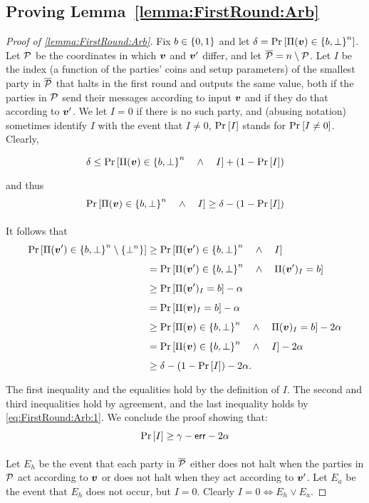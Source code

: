 \subsection{Proving Lemma~\ref{lemma:FirstRound:Arb}}
\begin{proof}[Proof of \cref{lemma:FirstRound:Arb}]
Fix $b \in \{0,1\}$ and let $\delta = \Pr_{}\left[\Pi({ \boldsymbol{v}}) \in \left\{b,\bot\right\}^n\right]$. Let $\mathcal{P}$ be the coordinates in which ${ \boldsymbol{v}}$ and ${ \boldsymbol{v}}'$ differ, and let ${\overline{\mathcal{P}}} = n \setminus \mathcal{P}$. Let $I$ be the index (a function of the parties' coins and setup parameters) of the smallest party in ${\overline{\mathcal{P}}}$ that halts in the first round and outputs the same value, both if the parties in $\mathcal{P}$ send their messages according to input ${ \boldsymbol{v}}$ and if they do that according to ${ \boldsymbol{v}}'$. We let $I=0$ if there is no such party, and (abusing notation) sometimes identify $I$ with the event that $I\neq 0$, \eg $\Pr_{}\left[I\right]$ stands for $\Pr_{}\left[I\ne 0\right]$. Clearly,

\begin{align*}
\delta \le \Pr_{}\left[\Pi({ \boldsymbol{v}}) \in \left\{b,\bot\right\}^n \quad \land \quad I\right]+ (1- \Pr_{}\left[I\right])
\end{align*}
and thus
\begin{align}\label{eq:FirstRound:Arb:1}
\Pr_{}\left[\Pi({ \boldsymbol{v}}) \in \left\{b,\bot\right\}^n \quad \land \quad I\right] \ge \delta - (1-\Pr_{}\left[I\right])
\end{align}
	
It follows that
\begin{align}\label{eq:FirstRound:Arb:2}
\Pr_{}\left[\Pi({ \boldsymbol{v}}') \in \left\{b,\bot\right\}^n \setminus \left\{\bot^n\right\}\right] &\ge \Pr_{}\left[\Pi({ \boldsymbol{v}}') \in \left\{b,\bot\right\}^n \quad \land \quad I\right]\\
&=\Pr_{}\left[\Pi({ \boldsymbol{v}}') \in \left\{b,\bot\right\}^n \quad \land \quad \Pi({ \boldsymbol{v}}')_I= b\right]\nonumber\\
&\ge \Pr_{}\left[\Pi({ \boldsymbol{v}}')_I= b\right] - \alpha\nonumber\\
&= \Pr_{}\left[\Pi({ \boldsymbol{v}})_I = b\right] - \alpha\nonumber\\
&\ge \Pr_{}\left[\Pi({ \boldsymbol{v}}) \in \left\{b,\bot\right\}^n \quad \land \quad \Pi({ \boldsymbol{v}})_I = b\right] - 2\alpha\nonumber\\
&= \Pr_{}\left[\Pi({ \boldsymbol{v}}) \in \left\{b,\bot\right\}^n \quad \land \quad I\right] - 2\alpha\nonumber\\
&\ge \delta - (1-\Pr_{}\left[I\right]) - 2\alpha.\nonumber
\end{align}
The first inequality and the equalities hold by the definition of $I$. The second and third inequalities hold by agreement, and the last inequality holds by \cref{eq:FirstRound:Arb:1}. We conclude the proof showing that:
\begin{align}\label{claim:FirstRound:Arb}
	\Pr_{}\left[I\right] \ge \gamma - \mathsf{err} - 2\alpha
\end{align}

Let $E_h$ be the event that each party in ${\overline{\mathcal{P}}}$ either does not halt when the parties in $\mathcal{P}$ act according to ${ \boldsymbol{v}}$ or does not halt when they act according to ${ \boldsymbol{v}}'$. Let $E_a$ be the event that $E_h$ does not occur, but $I = 0$. Clearly $I = 0 \Longleftrightarrow E_h \lor E_a$.


\end{proof}
